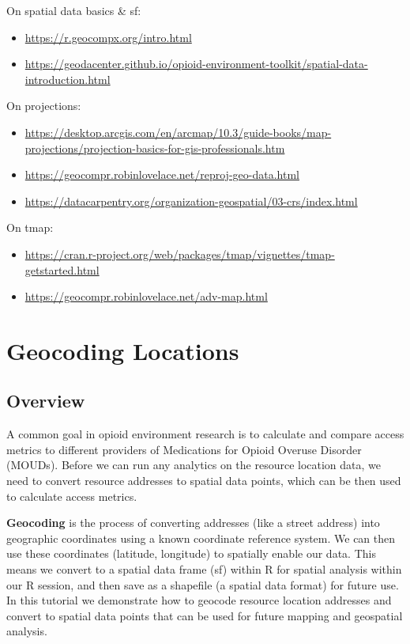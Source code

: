 \documentclass[
  letterpaper,
  DIV=11,
  numbers=noendperiod]{scrreprt}
\begin{document}
On spatial data basics \& sf:

\begin{itemize}
\item
  \url{https://r.geocompx.org/intro.html}
\item
  \url{https://geodacenter.github.io/opioid-environment-toolkit/spatial-data-introduction.html}
\end{itemize}

On projections:

\begin{itemize}
\item
  \url{https://desktop.arcgis.com/en/arcmap/10.3/guide-books/map-projections/projection-basics-for-gis-professionals.htm}
\item
  \url{https://geocompr.robinlovelace.net/reproj-geo-data.html}
\item
  \url{https://datacarpentry.org/organization-geospatial/03-crs/index.html}
\end{itemize}

On tmap:

\begin{itemize}
\item
  \url{https://cran.r-project.org/web/packages/tmap/vignettes/tmap-getstarted.html}
\item
  \url{https://geocompr.robinlovelace.net/adv-map.html}
\end{itemize}


\chapter{Geocoding Locations}\label{geocode-points}

\section{Overview}\label{GA-research-question}

A common goal in opioid environment research is to calculate and compare
access metrics to different providers of Medications for Opioid Overuse
Disorder (MOUDs). Before we can run any analytics on the resource
location data, we need to convert resource addresses to spatial data
points, which can be then used to calculate access metrics.

\textbf{Geocoding} is the process of converting addresses (like a street
address) into geographic coordinates using a known coordinate reference
system. We can then use these coordinates (latitude, longitude) to
spatially enable our data. This means we convert to a spatial data frame
(sf) within R for spatial analysis within our R session, and then save
as a shapefile (a spatial data format) for future use. In this tutorial
we demonstrate how to geocode resource location addresses and convert to
spatial data points that can be used for future mapping and geospatial
analysis.
\end{document}
